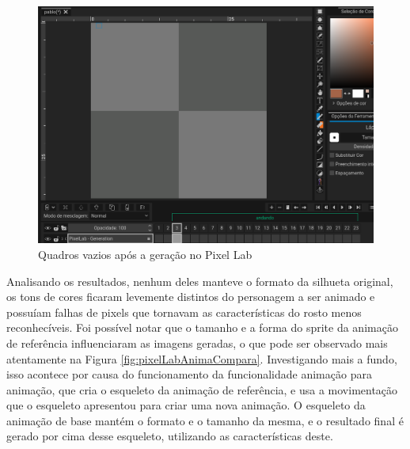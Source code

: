 \begin{figure}[htbp]
    \centering
    \caption{\small Quadros vazios após a geração no Pixel Lab}
    \label{fig:pixelLabAniTelaFalha}
    \includegraphics[width=0.7\linewidth]{figs/pixelLab/dia3/falha3.PNG}
\end{figure}

Analisando os resultados, nenhum deles manteve o formato da silhueta original, os tons de cores ficaram levemente distintos do personagem a ser animado e possuíam falhas de pixels que tornavam as características do rosto menos reconhecíveis. Foi possível notar que o tamanho e a forma do sprite da animação de referência influenciaram as imagens geradas, o que pode ser observado mais atentamente na Figura \ref{fig:pixelLabAnimaCompara}. Investigando mais a fundo, isso acontece por causa do funcionamento da funcionalidade animação para animação, que cria o esqueleto da animação de referência, e usa a movimentação que o esqueleto apresentou para criar uma nova animação. O esqueleto da animação de base mantém o formato e o tamanho da mesma, e o resultado final é gerado por cima desse esqueleto, utilizando as características deste.

